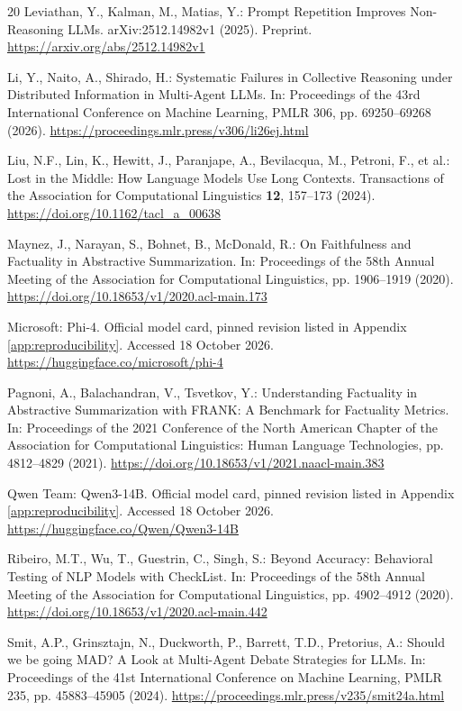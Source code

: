 \documentclass{svproc}
\begin{document}
\begin{thebibliography}{20}
Leviathan, Y., Kalman, M., Matias, Y.: Prompt Repetition Improves Non-Reasoning
LLMs. arXiv:2512.14982v1 (2025). Preprint.
\url{https://arxiv.org/abs/2512.14982v1}

Li, Y., Naito, A., Shirado, H.: Systematic Failures in Collective Reasoning under
Distributed Information in Multi-Agent LLMs. In: Proceedings of the 43rd
International Conference on Machine Learning, PMLR 306, pp. 69250--69268 (2026).
\url{https://proceedings.mlr.press/v306/li26ej.html}

Liu, N.F., Lin, K., Hewitt, J., Paranjape, A., Bevilacqua, M., Petroni, F., et al.: Lost in the Middle: How Language Models Use Long Contexts.
Transactions of the Association for Computational Linguistics \textbf{12},
157--173 (2024). \url{https://doi.org/10.1162/tacl_a_00638}

Maynez, J., Narayan, S., Bohnet, B., McDonald, R.: On Faithfulness and Factuality
in Abstractive Summarization. In: Proceedings of the 58th Annual Meeting of the
Association for Computational Linguistics, pp. 1906--1919 (2020).
\url{https://doi.org/10.18653/v1/2020.acl-main.173}

Microsoft: Phi-4. Official model card, pinned revision listed in
Appendix \ref{app:reproducibility}. Accessed 18 October 2026.
\url{https://huggingface.co/microsoft/phi-4}

Pagnoni, A., Balachandran, V., Tsvetkov, Y.: Understanding Factuality in Abstractive
Summarization with FRANK: A Benchmark for Factuality Metrics. In: Proceedings of
the 2021 Conference of the North American Chapter of the Association for
Computational Linguistics: Human Language Technologies, pp. 4812--4829 (2021).
\url{https://doi.org/10.18653/v1/2021.naacl-main.383}

Qwen Team: Qwen3-14B. Official model card, pinned revision listed in
Appendix \ref{app:reproducibility}. Accessed 18 October 2026.
\url{https://huggingface.co/Qwen/Qwen3-14B}

Ribeiro, M.T., Wu, T., Guestrin, C., Singh, S.: Beyond Accuracy: Behavioral
Testing of NLP Models with CheckList. In: Proceedings of the 58th Annual Meeting
of the Association for Computational Linguistics, pp. 4902--4912 (2020).
\url{https://doi.org/10.18653/v1/2020.acl-main.442}

Smit, A.P., Grinsztajn, N., Duckworth, P., Barrett, T.D., Pretorius, A.:
Should we be going MAD? A Look at Multi-Agent Debate Strategies for LLMs.
In: Proceedings of the 41st International Conference on Machine Learning,
PMLR 235, pp. 45883--45905 (2024).
\url{https://proceedings.mlr.press/v235/smit24a.html}


\end{thebibliography}
\end{document}
